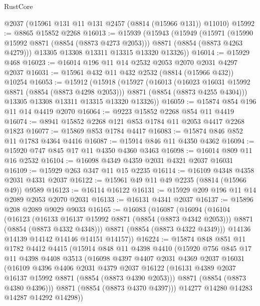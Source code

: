 \begin{lexlean}{RustCore}
\begin{coremodule}
    @2037
    (@15961 @131 @11 @131 @2457 (@8814 (@15966 @131)) @11010)
@15992 := @8865 @15852 @2268
@16013 := @15939
    (@15943
      (@15949
        (@15971 (@15990 @15992 @8871 (@8854 (@8873 @4273 @2053))) @8871 (@8854 (@8873 @4263 @4279)))
        @13305
        @13308
        @13311
        @13315
        @13320
        @13326))
@16014 := @15929 @468
@16023 := @16014 @196 @11 @14 @2532 @2053 @2070 @2031 @4297 @2037
@16031 := @15961 @432 @11 @432 @2532 (@8814 (@15966 @432)) @10254
@16053 := @15912
    (@15918
      (@15927
        (@16013
          (@16023 @16031 @15992 @8871 (@8854 (@8873 @4298 @2053)))
          @8871
          (@8854 (@8873 @4255 @4304)))
        @13305
        @13308
        @13311
        @13315
        @13320
        @13326))
@16059 := @15874 @854 @196 @11 @14 @4419 @2070
@16064 := @9223 @15852 @2268 @854 @11 @4419
@16074 := @8941 @15852 @2268 @121 @853 @1784 @11 @2053 @4417 @2268 @1823
@16077 := @15869 @853 @1784 @4417
@16083 := @15874 @846 @852 @11 @1783 @4364 @4416
@16087 := @15914 @846 @11 @4350 @4362
@16094 := @15920 @747 @845 @17 @11 @4350 @4360 @3463
@16098 := @16014 @809 @11 @16 @2532
@16104 := @16098 @4349 @4359 @2031 @4321 @2037 @16031
@16109 := @15929 @263 @347 @11 @15 @2235
@16114 := @16109 @4348 @4358 @2031 @4331 @2037
@16122 := @15961 @49 @11 @49 @2235 (@8814 (@15966 @49)) @9589
@16123 := @16114 @16122
@16131 := @15929 @209 @196 @11 @14 @2089 @2053 @2070 @2031
@16133 := @16131 @4341 @2037
@16137 := @15896 @208 @2089 @9029 @9033
@16165 := @16083
    (@16087
      (@16094
        (@16104
          (@16123
            (@16133 @16137 @15992 @8871 (@8854 (@8873 @4342 @2053)))
            @8871
            (@8854 (@8873 @4332 @4348)))
          @8871
          (@8854 (@8873 @4322 @4349)))
        @14136
        @14139
        @14142
        @14146
        @14151
        @14157))
@16224 := @15874
    @848
    @851
    @11
    @1782
    @4412
    @4415
    (@15914
      @848
      @11
      @4398
      @4410
      (@15920
        @756
        @845
        @17
        @11
        @4398
        @4408
        @3513
        (@16098
          @4397
          @4407
          @2031
          @4369
          @2037
          @16031
          (@16109
            @4396
            @4406
            @2031
            @4379
            @2037
            @16122
            (@16131 @4389 @2037 @16137 @15992 @8871 (@8854 (@8873 @4390 @2053)))
            @8871
            (@8854 (@8873 @4380 @4396)))
          @8871
          (@8854 (@8873 @4370 @4397)))
        @14277
        @14280
        @14283
        @14287
        @14292
        @14298))

\end{coremodule}
\end{lexlean}
